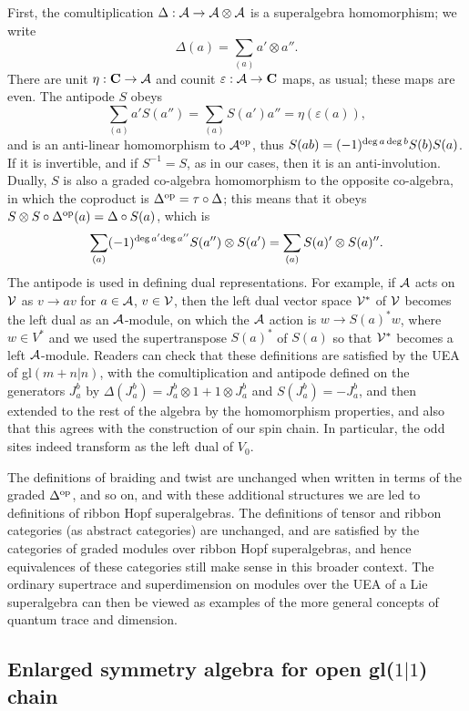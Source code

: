 \documentclass[twocolumn,floats,pra]{revtex4}
\def \cA {{\cal A}}
\newcommand {\be}{\begin{equation}}
\newcommand {\ee} {\end{equation}}
\begin{document}
First, the comultiplication $\Delta:\cA\to\cA\otimes\cA$ is a
superalgebra homomorphism; we write %
\be%
\Delta(a)=\sum_{(a)}a'\otimes a''.\ee%
There are unit $\eta:{\bf C}\to\cA$ and counit
$\varepsilon:\cA\to{\bf C}$ maps, as usual; these maps are even.
The antipode $S$
obeys%
\be%
\sum_{(a)}a'S(a'')=\sum_{(a)}S(a')a''=\eta(\varepsilon(a)),\ee%
and is an anti-linear homomorphism to $\cA^{\rm op}$, thus
$S(ab)=(-1)^{{\rm deg}\,a\,{\rm deg}\, b}S(b)S(a)$. If it is
invertible, and if $S^{-1}=S$, as in our cases, then it is an
anti-involution. Dually, $S$ is also a graded co-algebra
homomorphism to the opposite co-algebra, in which the coproduct is
$\Delta^{\rm op}=\tau\circ\Delta$; this means that it obeys
$S\otimes S\circ\Delta^{\rm op}(a)=\Delta\circ S(a)$, which is %
\be%
\sum_{(a)}(-1)^{{\rm deg}\,a'{\rm
deg}\,a''}S(a'')\otimes S(a')=\sum_{(a)}S(a)'\otimes S(a)''.\ee%
The antipode is used in defining dual representations. For
example, if $\cA$ acts on $\cal V$ as $v\to av$ for $a\in \cA$,
$v\in {\cal V}$, then the left dual vector space ${\cal V}^*$ of
$\cal V$ becomes the left dual as an $\cA$-module, on which the
$\cA$ action is $w\to S(a)^*w$, where $w\in V^*$ and we used the
supertranspose $S(a)^*$ of $S(a)$ so that ${\cal V}^*$ becomes a
left $\cA$-module. Readers can check that these definitions are
satisfied by the UEA of gl$(m+n|n)$, with the comultiplication and
antipode defined on the generators $J_a^b$ by
$\Delta(J_a^b)=J_a^b\otimes 1+ 1\otimes J_a^b$ and
$S(J_a^b)=-J_a^b$, and then extended to the rest of the algebra by
the homomorphism properties, and also that this agrees with the
construction of our spin chain. In particular, the odd sites
indeed transform as the left dual of $V_0$.


The definitions of braiding and twist are unchanged when written
in terms of the graded $\Delta^{\rm op}$, and so on, and with
these additional structures we are led to definitions of ribbon
Hopf superalgebras. The definitions of tensor and ribbon
categories (as abstract categories) are unchanged, and are
satisfied by the categories of graded modules over ribbon Hopf
superalgebras, and hence equivalences of these categories still
make sense in this broader context. The ordinary supertrace and
superdimension on modules over the UEA of a Lie superalgebra can
then be viewed as examples of the more general concepts of quantum
trace and dimension.


\subsection{Enlarged symmetry algebra for open gl($1|1$) chain}
\end{document}
